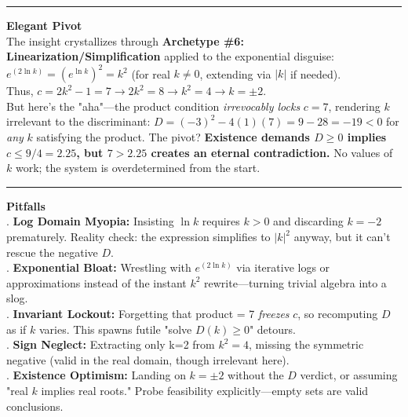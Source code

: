 \documentclass{article}
\begin{document}
\noindent \rule{\textwidth}{0.4pt}

\noindent \textbf{Elegant Pivot} \\

\noindent The insight crystallizes through \textbf{Archetype \#6: Linearization/Simplification} applied to the exponential disguise: $e^{(2 \ln k)} = (e^{\ln k})^2 = k^2$ (for real $k \neq 0$, extending via $|k|$ if needed). \\

\noindent Thus, $c = 2k^2 - 1 = 7 \to 2k^2 = 8 \to k^2 = 4 \to k = \pm 2$. \\

\noindent But here's the "aha"—the product condition \textit{irrevocably locks} $c = 7$, rendering $k$ irrelevant to the discriminant: $D = (-3)^2 - 4(1)(7) = 9 - 28 = -19 < 0$ for \textit{any} $k$ satisfying the product. The pivot? \textbf{Existence demands $D \ge 0$ implies $c \le 9/4 = 2.25$, but $7 > 2.25$ creates an eternal contradiction.} No values of $k$ work; the system is overdetermined from the start. \\

\noindent \rule{\textwidth}{0.4pt}

\noindent \textbf{Pitfalls} \\

. \textbf{Log Domain Myopia:} Insisting $\ln k$ requires $k > 0$ and discarding $k = -2$ prematurely. Reality check: the expression simplifies to $|k|^2$ anyway, but it can't rescue the negative $D$. \\

. \textbf{Exponential Bloat:} Wrestling with $e^{(2 \ln k)}$ via iterative logs or approximations instead of the instant $k^2$ rewrite—turning trivial algebra into a slog. \\

. \textbf{Invariant Lockout:} Forgetting that product = 7 \textit{freezes} $c$, so recomputing $D$ as if $k$ varies. This spawns futile "solve $D(k) \ge 0$" detours. \\

. \textbf{Sign Neglect:} Extracting only k=2 from $k^2=4$, missing the symmetric negative (valid in the real domain, though irrelevant here). \\

. \textbf{Existence Optimism:} Landing on $k = \pm 2$ without the $D$ verdict, or assuming "real $k$ implies real roots." Probe feasibility explicitly—empty sets are valid conclusions. \\
\end{document}
